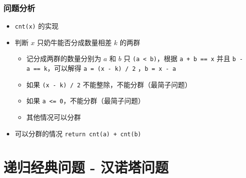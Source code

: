 \begin{frame}[fragile]
    \frametitle{问题分析}
     {
        \begin{itemize}
            \item<1-> \lstinline|cnt(x)| 的实现
            \item<1-> 判断 $x$ 只奶牛能否分成数量相差 $k$ 的两群
                \begin{itemize}
                    \item 记分成两群的数量分别为 $a$ 和 $b$ 只 \lstinline|(a < b)|，根据 \lstinline|a + b == x| 
                            并且 \lstinline|b - a == k|，可以解得 \lstinline|a = (x - k) / 2| ，\lstinline|b = x - a|
                    \item 如果 \lstinline|(x - k) / 2| 不能整除，不能分群（最简子问题）
                    \item 如果 \lstinline|a <= 0|，不能分群（最简子问题）
                    \item 其他情况可以分群
                \end{itemize}
            \item<2> 可以分群的情况 \lstinline|return cnt(a) + cnt(b)|
        \end{itemize}
    }
     {
        
    }

\end{frame}


\section{递归经典问题 - 汉诺塔问题}

